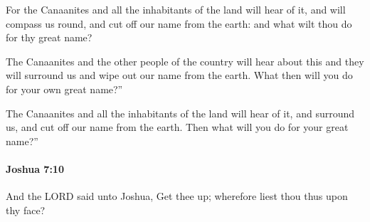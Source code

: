			\begin{versebox}
					\item[BHS] 
					\item[ASV] For the Canaanites and all the inhabitants of the land will hear of it, and will compass us round, and cut off our name from the earth: and what wilt thou do for thy great name?
					\item[NIV] The Canaanites and the other people of the country will hear about this and they will surround us and wipe out our name from the earth. What then will you do for your own great name?”
					\item[NRSV] The Canaanites and all the inhabitants of the land will hear of it, and surround us, and cut off our name from the earth. Then what will you do for your great name?”
			\end{versebox}

		\paragraph{Joshua 7:10} %
			\label{JOSHUA-7-10}

			And the LORD said unto Joshua, Get thee up; wherefore liest thou thus upon thy face?

